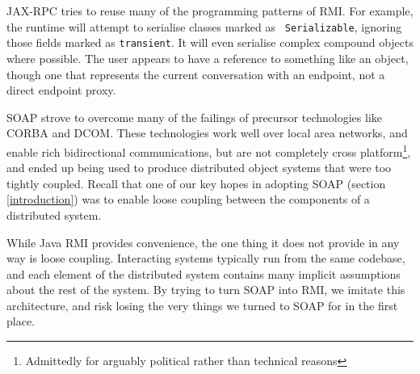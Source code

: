 JAX-RPC tries to reuse many of the programming patterns of RMI. For
example, the runtime will attempt to serialise classes marked as {\tt
Serializable}, ignoring those fields marked as {\tt transient}. It
will even serialise complex compound objects where possible. The user
appears to have a reference to something like an object, though one
that represents the current conversation with an endpoint, not a
direct endpoint proxy.

SOAP strove to overcome many of the failings of precursor technologies
like CORBA and DCOM. These technologies work well over local area
networks, and enable rich bidirectional communications, but are not
completely cross platform\footnote{Admittedly for arguably political
rather than technical reasons}, and ended up being used to produce
distributed object systems that were too tightly coupled. Recall that
one of our key hopes in adopting SOAP (section \ref{introduction}) was
to enable loose coupling between the components of a distributed
system.

While Java RMI provides convenience, the one thing it does not provide
in any way is loose coupling. Interacting systems typically run from
the same codebase, and each element of the distributed system contains
many implicit assumptions about the rest of the system. By trying to
turn SOAP into RMI, we imitate this architecture, and risk losing the
very things we turned to SOAP for in the first place.





